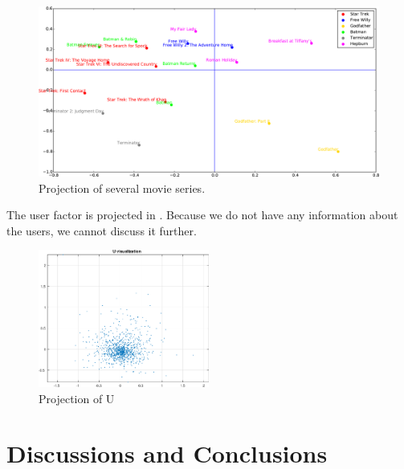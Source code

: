 \documentclass[12pt]{article}
\begin{document}
\begin{figure}[h!]
  \centering
      \includegraphics[width=\textwidth]{3_Series-crop.pdf}
  \caption{Projection of several movie series.}
  \label{fig:series}
\end{figure}


The user factor is projected in . Because we do not have any information about the users, we cannot discuss it further.
\begin{figure}[h!]
  \centering
      \includegraphics[width=0.5\textwidth]{U-crop.pdf}
  \caption{Projection of U}
  \label{fig:U}
\end{figure}

\clearpage
\section{Discussions and Conclusions}
\end{document}
